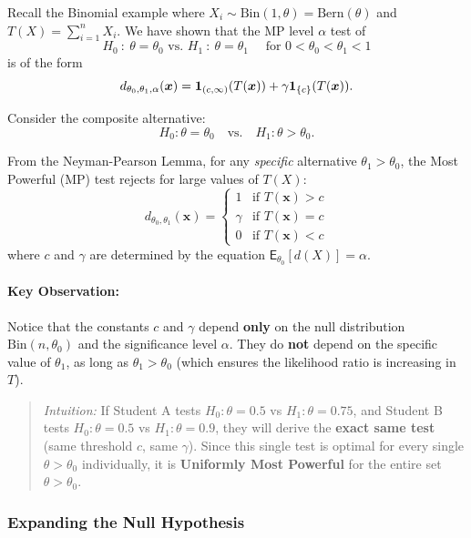\begin{ex} 
    
Recall the Binomial example where $X_i \sim \text{Bin}(1, \theta) = \text{Bern}(\theta)$ and $T(X) = \sum\limits_{i=1}^{n} X_i$.
We have shown that the MP level \(\alpha\) test of 
\[
    H_0 \: : \: \theta = \theta_0 \text{ vs. } H_1 \: : \: \theta = \theta_1 \quad \text{ for }0<\theta_0<\theta_1<1
\]
is of the form 
\[
    d_{\theta_0,\theta_1,\alpha}(\boldsymbol{x}) = \boldsymbol{1}_{(c,\infty)}(T(\boldsymbol{x})) + \gamma \boldsymbol{1}_{\{c\}}(T(\boldsymbol{x})).
\]

Consider the composite alternative:
\[ H_0: \theta = \theta_0 \quad \text{vs.} \quad H_1: \theta > \theta_0. \]

From the Neyman-Pearson Lemma, for any \textit{specific} alternative $\theta_1 > \theta_0$, the Most Powerful (MP) test rejects for large values of $T(X)$:
\[ d_{\theta_0, \theta_1}(\mathbf{x}) = \begin{cases} 1 & \text{if } T(\mathbf{x}) > c \\ \gamma & \text{if } T(\mathbf{x}) = c \\ 0 & \text{if } T(\mathbf{x}) < c \end{cases} \]
where $c$ and $\gamma$ are determined by the equation $\mathsf{E}_{\theta_0}[d(X)] = \alpha$.

\paragraph{Key Observation:}
Notice that the constants $c$ and $\gamma$ depend \textbf{only} on the null distribution $\text{Bin}(n, \theta_0)$ and the significance level $\alpha$. They do \textbf{not} depend on the specific value of $\theta_1$, as long as $\theta_1 > \theta_0$ (which ensures the likelihood ratio is increasing in $T$).

\begin{quote}
\textit{Intuition:} If Student A tests $H_0: \theta=0.5$ vs $H_1: \theta=0.75$, and Student B tests $H_0: \theta=0.5$ vs $H_1: \theta=0.9$, they will derive the \textbf{exact same test} (same threshold $c$, same $\gamma$). Since this single test is optimal for every single $\theta > \theta_0$ individually, it is \textbf{Uniformly Most Powerful} for the entire set $\theta > \theta_0$.
\end{quote}

\subsubsection{Expanding the Null Hypothesis}


\end{ex}
